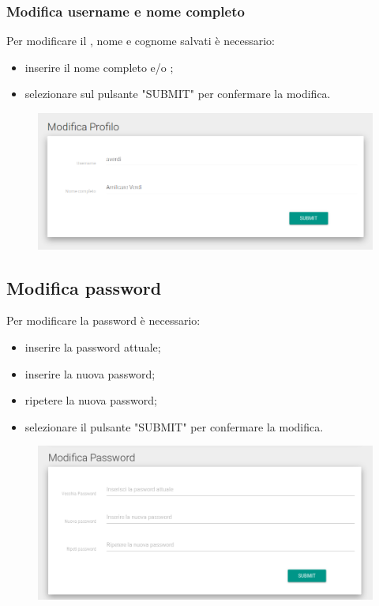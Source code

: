 \documentclass[12pt,a4paper]{article}
\begin{document}
	\subsubsection{Modifica username e nome completo}
	Per modificare il , nome e cognome salvati è necessario:
	\begin{itemize}
		\item inserire il nome completo e/o ;
		\item selezionare sul pulsante "SUBMIT" per confermare la modifica.
	\end{itemize}
	\begin{figure}[h]
		
		\centering
		\includegraphics[width=1.0\linewidth]{../img/screenshot/user1.png}
		\caption{}
		\label{Modifica profilo}
	\end{figure}

	
	\subsection{Modifica password}
	Per modificare la password  è necessario:
	\begin{itemize}
		\item inserire la password attuale;
		\item inserire la nuova password;
		\item ripetere la nuova password;
		\item selezionare il pulsante "SUBMIT" per confermare la modifica.
	\end{itemize}
	\begin{figure}[h]

		\centering
		\includegraphics[width=1.0\linewidth]{../img/screenshot/user2.png}
		\caption{}
		\label{Modifica password}
	\end{figure}
	
\end{document}

